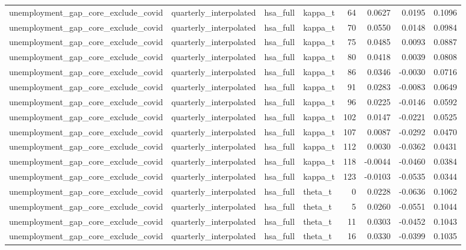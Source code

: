 \begin{tabular}{llllrrrr}
unemployment\_gap\_core\_exclude\_covid & quarterly\_interpolated & hsa\_full & kappa\_t & 64 & 0.0627 & 0.0195 & 0.1096 \\
unemployment\_gap\_core\_exclude\_covid & quarterly\_interpolated & hsa\_full & kappa\_t & 70 & 0.0550 & 0.0148 & 0.0984 \\
unemployment\_gap\_core\_exclude\_covid & quarterly\_interpolated & hsa\_full & kappa\_t & 75 & 0.0485 & 0.0093 & 0.0887 \\
unemployment\_gap\_core\_exclude\_covid & quarterly\_interpolated & hsa\_full & kappa\_t & 80 & 0.0418 & 0.0039 & 0.0808 \\
unemployment\_gap\_core\_exclude\_covid & quarterly\_interpolated & hsa\_full & kappa\_t & 86 & 0.0346 & -0.0030 & 0.0716 \\
unemployment\_gap\_core\_exclude\_covid & quarterly\_interpolated & hsa\_full & kappa\_t & 91 & 0.0283 & -0.0083 & 0.0649 \\
unemployment\_gap\_core\_exclude\_covid & quarterly\_interpolated & hsa\_full & kappa\_t & 96 & 0.0225 & -0.0146 & 0.0592 \\
unemployment\_gap\_core\_exclude\_covid & quarterly\_interpolated & hsa\_full & kappa\_t & 102 & 0.0147 & -0.0221 & 0.0525 \\
unemployment\_gap\_core\_exclude\_covid & quarterly\_interpolated & hsa\_full & kappa\_t & 107 & 0.0087 & -0.0292 & 0.0470 \\
unemployment\_gap\_core\_exclude\_covid & quarterly\_interpolated & hsa\_full & kappa\_t & 112 & 0.0030 & -0.0362 & 0.0431 \\
unemployment\_gap\_core\_exclude\_covid & quarterly\_interpolated & hsa\_full & kappa\_t & 118 & -0.0044 & -0.0460 & 0.0384 \\
unemployment\_gap\_core\_exclude\_covid & quarterly\_interpolated & hsa\_full & kappa\_t & 123 & -0.0103 & -0.0535 & 0.0344 \\
unemployment\_gap\_core\_exclude\_covid & quarterly\_interpolated & hsa\_full & theta\_t & 0 & 0.0228 & -0.0636 & 0.1062 \\
unemployment\_gap\_core\_exclude\_covid & quarterly\_interpolated & hsa\_full & theta\_t & 5 & 0.0260 & -0.0551 & 0.1044 \\
unemployment\_gap\_core\_exclude\_covid & quarterly\_interpolated & hsa\_full & theta\_t & 11 & 0.0303 & -0.0452 & 0.1043 \\
unemployment\_gap\_core\_exclude\_covid & quarterly\_interpolated & hsa\_full & theta\_t & 16 & 0.0330 & -0.0399 & 0.1035 \\

\end{tabular}

